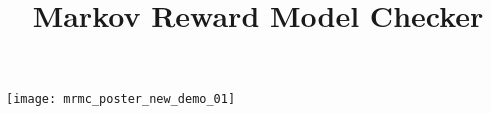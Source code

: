 \documentclass[a0,portrait]{a0poster}
\title{Markov Reward Model Checker}
\begin{document}
	\texttt{[image: mrmc\_poster\_new\_demo\_01]}
\end{document}
